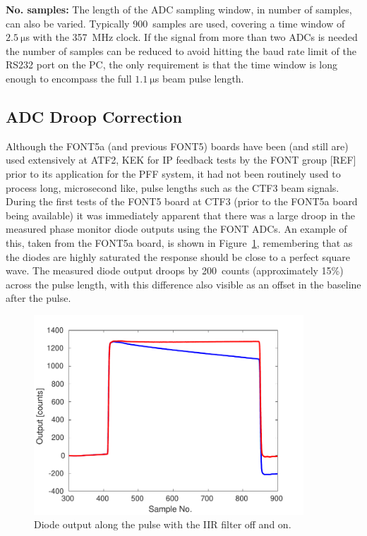 \textbf{No. samples:} The length of the ADC sampling window, in number of samples, can also be varied. Typically 900~samples are used, covering a time window of \(2.5~\mathrm{\mu}\)s with the 357~MHz clock. If the signal from more than two ADCs is needed the number of samples can be reduced to avoid hitting the baud rate limit of the RS232 port on the PC, the only requirement is that the time window is long enough to encompass the full \(1.1~\mathrm{\mu}\)s beam pulse length.


\subsection{ADC Droop Correction}
\label{ss:droopCorr}

Although the FONT5a (and previous FONT5) boards have been (and still are) used extensively at ATF2, KEK for IP feedback tests by the FONT group [REF] prior to its application for the PFF system, it had not been routinely used to process long, microsecond like, pulse lengths such as the CTF3 beam signals. During the first tests of the FONT5 board at CTF3 (prior to the FONT5a board being available) it was immediately apparent that there was a large droop in the measured phase monitor diode outputs using the FONT ADCs. An example of this, taken from the FONT5a board, is shown in Figure~\ref{f:iirDiodefiltOffOn}, remembering that as the diodes are highly saturated the response should be close to a perfect square wave. The measured diode output droops by 200~counts (approximately 15\%) across the pulse length, with this difference also visible as an offset in the baseline after the pulse.

\begin{figure}
  \centering
  \includegraphics[width=0.9\textwidth]{Figures/commissioning/iirDiodeFiltOffOn}
  \caption{Diode output along the pulse with the IIR filter off and on.}
  \label{f:iirDiodefiltOffOn}
\end{figure}

